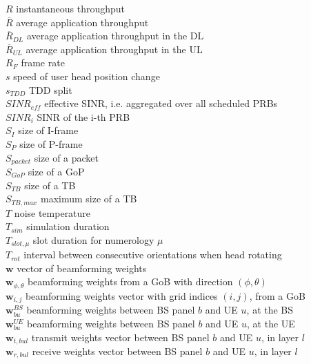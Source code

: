 $R$ \mytab instantaneous throughput \\
$\overline{R}$ \mytab average application throughput \\
$\overline{R}_{DL}$ \mytab average application throughput in the \acs{DL}\\
$\overline{R}_{UL}$ \mytab average application throughput in the \acs{UL}\\
$R_F$ \mytab frame rate \\
$s$ \mytab speed of user head position change \\
$s_{TDD}$ \mytab \acs{TDD} split \\
$SINR_{eff}$ \mytab effective \acs{SINR}, i.e. aggregated over all scheduled PRBs \\
$SINR_i$ \mytab SINR of the i-th \acs{PRB} \\
$S_I$ \mytab size of I-frame\\
$S_P$ \mytab size of P-frame\\
$S_{packet}$ \mytab size of a packet\\
$S_{GoP}$ \mytab size of a \acs{GoP}\\
$S_{TB}$ \mytab size of a \acs{TB}\\
$S_{TB, max}$ \mytab maximum size of a \acs{TB}\\
$T$ \mytab noise temperature\\
$T_{sim}$ \mytab simulation duration\\
$T_{slot, \mu}$ \mytab slot duration for numerology $\mu$\\
$T_{rot}$ \mytab interval between consecutive orientations when head rotating\\
$\bm{w}$ \mytab vector of beamforming weights \\
$\bm{w}_{\phi, \theta}$ \mytab beamforming weights from a GoB with direction $(\phi, \theta)$ \\
$\bm{w}_{i,j}$ \mytab beamforming weights vector with grid indices $(i,j)$, from a GoB\\
$\bm{w}^{BS}_{bu}$ \mytab beamforming weights between BS panel $b$ and UE $u$, at the BS \\
$\bm{w}^{UE}_{bu}$ \mytab beamforming weights between BS panel $b$ and UE $u$, at the UE \\
$\bm{w}_{t, bul}$ \mytab transmit weights vector between BS panel $b$ and UE $u$, in layer $l$\\
$\bm{w}_{r, bul}$ \mytab receive weights vector between BS panel $b$ and UE $u$, in layer $l$\\

